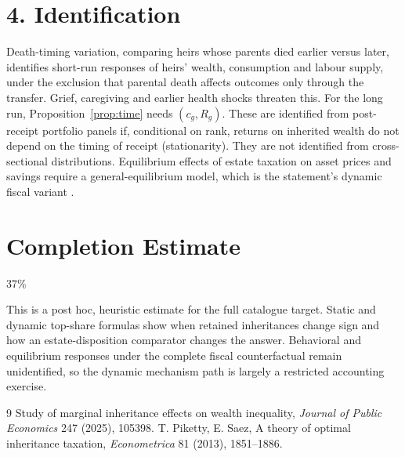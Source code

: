 \documentclass[11pt]{article}
\theoremstyle{definition}
\begin{document}
\section*{4. Identification}
Death-timing variation, comparing heirs whose parents died earlier versus later, identifies short-run responses of heirs'
wealth, consumption and labour supply, under the exclusion that parental death affects outcomes only through the transfer.
Grief, caregiving and earlier health shocks threaten this. For the long run, Proposition~\ref{prop:time} needs
$(c_g,R_g)$. These are identified from post-receipt portfolio panels if, conditional on rank, returns on inherited wealth do
not depend on the timing of receipt (stationarity). They are not identified from cross-sectional distributions. Equilibrium
effects of estate taxation on asset prices and savings require a general-equilibrium model, which is the statement's dynamic
fiscal variant \cite{jpube}.

\section{Completion Estimate}
37\%

This is a post hoc, heuristic estimate for the full catalogue target.
Static and dynamic top-share formulas show when retained inheritances change sign and how an estate-disposition comparator changes the answer. Behavioral and equilibrium responses under the complete fiscal counterfactual remain unidentified, so the dynamic mechanism path is largely a restricted accounting exercise.

\begin{thebibliography}{9}
 Study of marginal inheritance effects on wealth inequality, \emph{Journal of Public Economics} 247 (2025), 105398.
 T. Piketty, E. Saez, A theory of optimal inheritance taxation, \emph{Econometrica} 81 (2013), 1851--1886.
\end{thebibliography}
\end{document}
